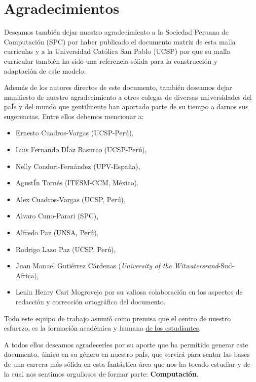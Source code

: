 \chapter*{Agradecimientos}\label{chap:cs-ack}
%

Deseamos también dejar nuestro agradecimiento a la Sociedad Peruana de Computación (SPC) por 
haber publicado el documento matriz de esta malla curriculas y a la Universidad Católica San Pablo (UCSP) 
por que su malla curricular también ha sido una referencia sólida para la construcción y adaptación de este modelo.

Además de los autores directos de este documento, también deseamos dejar manifiesto de nuestro 
agradecimiento a otros colegas de diversas universidades del paÍs y del mundo que gentilmente 
han aportado parte de su tiempo a darnos sus sugerencias. Entre ellos debemos mencionar a:

\begin{itemize}
\item Ernesto Cuadros-Vargas (UCSP-Perú), 
\item Luis Fernando DÍaz Basurco (UCSP-Perú), 
\item Nelly Condori-Fernández (UPV-España), 
\item AgustÍn Tornés (ITESM-CCM, México), 
\item Alex Cuadros-Vargas (UCSP, Perú),
\item Alvaro Cuno-Parari (SPC),
\item Alfredo Paz (UNSA, Perú), 
\item Rodrigo Lazo Paz (UCSP, Perú),
\item Juan Manuel Gutiérrez Cárdenas (\textit{University of the Witwatersrand}-Sud-Africa),
\item Lenin Henry Cari Mogrovejo por su valiosa colaboración en los aspectos de redacción y corrección ortográfica del documento.
\end{itemize}

Todo este equipo de trabajo asumió como premisa que el centro de nuestro esfuerzo, 
es la formación académica y humana \underline{de los estudiantes}.

A todos ellos deseamos agradecerles por su aporte que ha permitido generar 
este documento, úinico en su género en nuestro paÍs, que servirá para sentar las 
bases de una carrera más sólida en esta fantástica área que nos ha tocado estudiar y 
de la cual nos sentimos orgullosos de formar parte: \textbf{Computación}.
